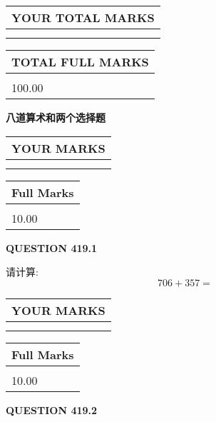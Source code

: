 \documentclass{ctexart}
\begin{document}
   
\vspace{0.2in}\noindent\begin{tabular}{|l|}
\hline
YOUR TOTAL MARKS  \\
\hline
 \\ 
 \\ 
\hline
\end{tabular}
\hspace{0.05in} \begin{tabular}{|l|}
\hline
TOTAL FULL MARKS  \\
\hline
 \\ 
100.00 \\
\hline
\end{tabular}
   
   
 \vspace{0.2in}
{\LARGE {\textbf{ 八道算术和两个选择题}}}
   
   
  
\vspace{0.2in}
  
\noindent\begin{tabular}{|l|}
\hline
 YOUR MARKS  \\
\hline
 \\ 
 \\ 
\hline
\end{tabular}
\hspace{0.05in} \begin{tabular}{|l|}
\hline
 Full Marks  \\
\hline
 \\ 
10.00 \\
\hline
\end{tabular}
{\textbf{\Large{QUESTION
419.1 
}}}
  
  
 
请计算:
\begin{equation}
706 +  %
357 = \nonumber
\end{equation}
 

 

 
  
\vspace{0.2in}
  
\noindent\begin{tabular}{|l|}
\hline
 YOUR MARKS  \\
\hline
 \\ 
 \\ 
\hline
\end{tabular}
\hspace{0.05in} \begin{tabular}{|l|}
\hline
 Full Marks  \\
\hline
 \\ 
10.00 \\
\hline
\end{tabular}
{\textbf{\Large{QUESTION
419.2 
}}}
  
\end{document}
